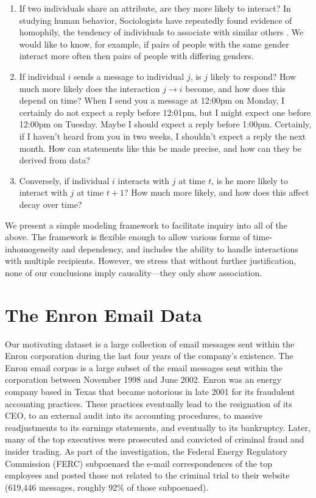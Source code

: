 \documentclass[aoas,preprint]{imsart}
\begin{document}
\begin{enumerate}

    \item If two individuals share an attribute, are they more likely to
    interact? In studying human behavior, Sociologists have repeatedly found
    evidence of homophily, the tendency of individuals to associate with
    similar others \cite{mcpherson2001birds}. We would like to know, for
    example, if pairs of people with the same gender interact more often then
    pairs of people with differing genders.

    \item If individual $i$ sends a message to individual $j$, is $j$ likely
    to respond? How much more likely does the interaction $j \to i$ become,
    and how does this depend on time? When I send you a message at 12:00pm on
    Monday, I certainly do not expect a reply before 12:01pm, but I might
    expect one before 12:00pm on Tuesday. Maybe I should expect a reply before
    1:00pm. Certainly, if I haven't heard from you in two weeks, I shouldn't
    expect a reply the next month. How can statements like this be made
    precise, and how can they be derived from data?

    \item Conversely, if individual $i$ interacts with $j$ at time $t$, is he
    more likely to interact with $j$ at time $t+1$? How much more likely, and
    how does this affect decay over time?

\end{enumerate}

We present a simple modeling framework to facilitate inquiry into all of the
above. The framework is flexible enough to allow various forms of
time-inhomogeneity and dependency, and includes the ability to handle
interactions with multiple recipients. However, we stress that without further
justification, none of our conclusions imply causality---they only show
association.


\section{The Enron Email Data}

Our motivating dataset is a large collection of email messages sent within the
Enron corporation during the last four years of the company's existence. The
Enron email corpus is a large subset of the email messages sent within the
corporation between November 1998 and June 2002. Enron was an energy company
based in Texas that became notorious in late 2001 for its fraudulent
accounting practices. These practices eventually lead to the resignation of
its CEO, to an external audit into its accounting procedures, to massive
readjustments to its earnings statements, and eventually to its bankruptcy.
Later, many of the top executives were prosecuted and convicted of criminal
fraud and insider trading. As part of the investigation, the Federal Energy
Regulatory Commission (FERC) subpoenaed the e-mail correspondences of the top
employees and posted those not related to the criminal trial to their website
(619,446 messages, roughly 92\% of those subpoenaed).
\end{document}
